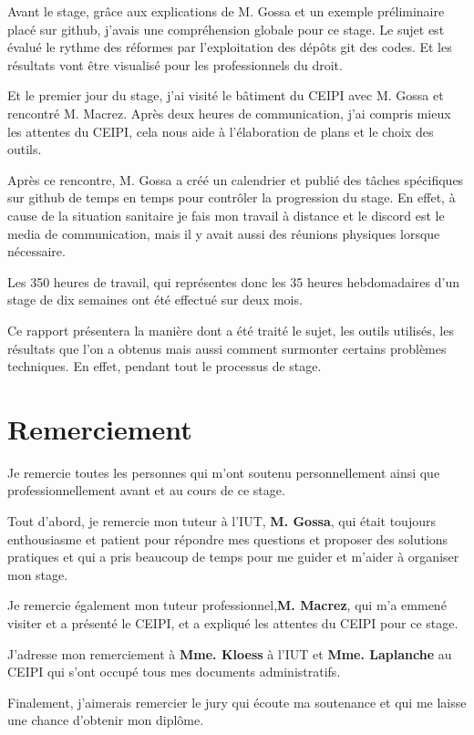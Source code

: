 \documentclass[
  oneside]{book}
\begin{document}
Avant le stage, grâce aux explications de M. Gossa et un exemple préliminaire placé sur github, j'avais une compréhension globale pour ce stage. Le sujet est évalué le rythme des réformes par l'exploitation des dépôts git des codes. Et les résultats vont être visualisé pour les professionnels du droit.

Et le premier jour du stage, j'ai visité le bâtiment du CEIPI avec M. Gossa et rencontré M. Macrez. Après deux heures de communication, j'ai compris mieux les attentes du CEIPI, cela nous aide à l'élaboration de plans et le choix des outils.

Après ce rencontre, M. Gossa a créé un calendrier et publié des tâches spécifiques sur github de temps en temps pour contrôler la progression du stage. En effet, à cause de la situation sanitaire je fais mon travail à distance et le discord est le media de communication, mais il y avait aussi des réunions physiques lorsque nécessaire.

Les 350 heures de travail, qui représentes donc les 35 heures hebdomadaires d'un stage de dix semaines ont été effectué sur deux mois.

Ce rapport présentera la manière dont a été traité le sujet, les outils utilisés, les résultats que l'on a obtenus mais aussi comment surmonter certains problèmes techniques. En effet, pendant tout le processus de stage.

\hypertarget{Remerc}{%
\chapter{Remerciement}\label{Remerc}}

Je remercie toutes les personnes qui m'ont soutenu personnellement ainsi que professionnellement avant et au cours de ce stage.

Tout d'abord, je remercie mon tuteur à l'IUT, \textbf{M. Gossa}, qui était toujours enthousiasme et patient pour répondre mes questions et proposer des solutions pratiques et qui a pris beaucoup de temps pour me guider et m'aider à organiser mon stage.

Je remercie également mon tuteur professionnel,\textbf{M. Macrez}, qui m'a emmené visiter et a présenté le CEIPI, et a expliqué les attentes du CEIPI pour ce stage.

J'adresse mon remerciement à \textbf{Mme. Kloess} à l'IUT et \textbf{Mme. Laplanche} au CEIPI qui s'ont occupé tous mes documents administratifs.

Finalement, j'aimerais remercier le jury qui écoute ma soutenance et qui me laisse une chance d'obtenir mon diplôme.
\end{document}
